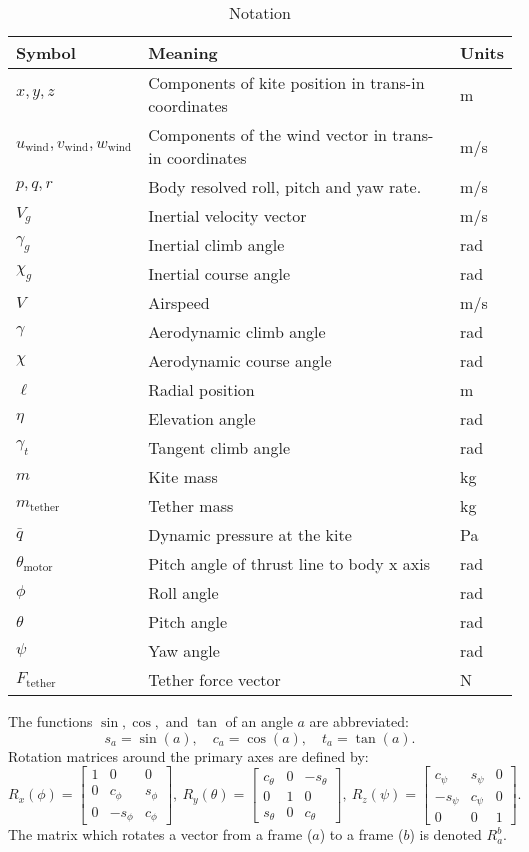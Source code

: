 \documentclass{article}
\newcommand{\uwind}{u_{\textrm{wind}}}
\newcommand{\vwind}{v_{\textrm{wind}}}
\newcommand{\wwind}{w_{\textrm{wind}}}
\newcommand{\radius}{\ell}
\newcommand{\cphi}{c_\phi}
\newcommand{\ctheta}{c_\theta}
\newcommand{\cpsi}{c_\psi}
\newcommand{\thetamotor}{\theta_{\textrm{motor}}}
\newcommand{\Ftether}{F_{\textrm{tether}}}
\newcommand{\sphi}{s_\phi}
\newcommand{\stheta}{s_\theta}
\newcommand{\spsi}{s_\psi}
\newcommand{\mtether}{m_\textrm{tether}}
\begin{document}
\begin{table}
\centering
\caption{Notation}
\begin{tabular}{|l|l|l|}
\hline
Symbol & Meaning & Units\\
\hline
$x,y,z$ & Components of kite position in trans-in coordinates & m \\
$\uwind,\vwind, \wwind$ & Components of the wind vector in trans-in coordinates & m/s\\
$p,q,r$ & Body resolved roll, pitch and yaw rate. & m/s \\
$V_g$ & Inertial velocity vector & m/s \\
$\gamma_g$ & Inertial climb angle & rad \\
$\chi_g$ & Inertial course angle & rad \\
$V$ & Airspeed & m/s \\
$\gamma$ & Aerodynamic climb angle & rad \\
$\chi$ & Aerodynamic course angle & rad \\
$\radius$ & Radial position & m \\
$\eta$ & Elevation angle & rad \\
$\gamma_t$ & Tangent climb angle & rad \\
$m$ & Kite mass & kg \\
$\mtether$ & Tether mass & kg \\
$\bar q$ & Dynamic pressure at the kite & Pa \\
$\thetamotor$ & Pitch angle of thrust line to body x axis & rad \\
$\phi$ & Roll angle & rad \\
$\theta$ & Pitch angle & rad \\
$\psi$ & Yaw angle & rad \\
$\Ftether$ & Tether force vector & N \\
\hline
\end{tabular}
\end{table}
The functions $\sin, \cos,$ and $\tan$ of an angle $a$ are abbreviated:
\[
s_a = \sin(a), \quad c_a = \cos(a), \quad t_a = \tan(a).
\]
Rotation matrices around the primary axes are defined by:
\begin{equation*}
R_x(\phi) = \begin{bmatrix}
1 & 0 & 0 \\
0 & \cphi & \sphi \\
0 & -\sphi & \cphi
\end{bmatrix}, \:
R_y(\theta) = \begin{bmatrix}
\ctheta & 0 & -\stheta \\
0 & 1 & 0 \\
\stheta & 0 & \ctheta
\end{bmatrix}, \:
R_z(\psi) = \begin{bmatrix}
\cpsi & \spsi & 0 \\
-\spsi & \cpsi & 0 \\
0 & 0 & 1
\end{bmatrix}.
\end{equation*}
The matrix which rotates a vector from a frame ($a$) to a frame ($b$)
is denoted $R_a^b$.
\end{document}
